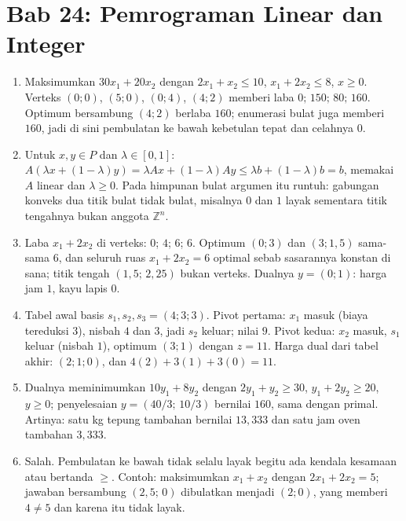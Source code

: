 
\section*{Bab 24: Pemrograman Linear dan Integer}
\begin{enumerate}[label=\textbf{24.\arabic*}]
  \item Maksimumkan $30x_{1}+20x_{2}$ dengan $2x_{1}+x_{2}\le10$, $x_{1}+2x_{2}\le8$,
        $x\ge0$. Verteks $(0;0)$, $(5;0)$, $(0;4)$, $(4;2)$ memberi laba
        $0;\,150;\,80;\,160$. Optimum bersambung $(4;2)$ berlaba $160$; enumerasi bulat
        juga memberi $160$, jadi di sini pembulatan ke bawah kebetulan tepat dan
        celahnya $0$.

  \item Untuk $x,y\in P$ dan $\lambda\in[0,1]$:
        $A(\lambda x+(1-\lambda)y)=\lambda Ax+(1-\lambda)Ay\le\lambda b+(1-\lambda)b=b$,
        memakai $A$ linear dan $\lambda\ge0$. Pada himpunan bulat argumen itu runtuh:
        gabungan konveks dua titik bulat tidak bulat, misalnya $0$ dan $1$ layak
        sementara titik tengahnya bukan anggota $\mathbb{Z}^{n}$.

  \item Laba $x_{1}+2x_{2}$ di verteks: $0$; $4$; $6$; $6$. Optimum $(0;3)$ dan
        $(3;1{,}5)$ sama-sama $6$, dan seluruh ruas $x_{1}+2x_{2}=6$ optimal sebab
        sasarannya konstan di sana; titik tengah $(1{,}5;\,2{,}25)$ bukan verteks.
        Dualnya $y=(0;1)$: harga jam $1$, kayu lapis $0$.

  \item Tabel awal basis $s_{1},s_{2},s_{3}=(4;3;3)$. Pivot pertama: $x_{1}$ masuk
        (biaya tereduksi $3$), nisbah $4$ dan $3$, jadi $s_{2}$ keluar; nilai $9$.
        Pivot kedua: $x_{2}$ masuk, $s_{1}$ keluar (nisbah $1$), optimum $(3;1)$
        dengan $z=11$. Harga dual dari tabel akhir: $(2;1;0)$, dan
        $4(2)+3(1)+3(0)=11$.

  \item Dualnya meminimumkan $10y_{1}+8y_{2}$ dengan $2y_{1}+y_{2}\ge30$,
        $y_{1}+2y_{2}\ge20$, $y\ge0$; penyelesaian $y=(40/3;\,10/3)$ bernilai
        $160$, sama dengan primal. Artinya: satu kg tepung tambahan bernilai
        $13{,}333$ dan satu jam oven tambahan $3{,}333$.

  \item Salah. Pembulatan ke bawah tidak selalu layak begitu ada kendala
        kesamaan atau bertanda $\ge$. Contoh: maksimumkan $x_{1}+x_{2}$ dengan
        $2x_{1}+2x_{2}=5$; jawaban bersambung $(2{,}5;\,0)$ dibulatkan menjadi
        $(2;0)$, yang memberi $4\ne5$ dan karena itu tidak layak.


\end{enumerate}
